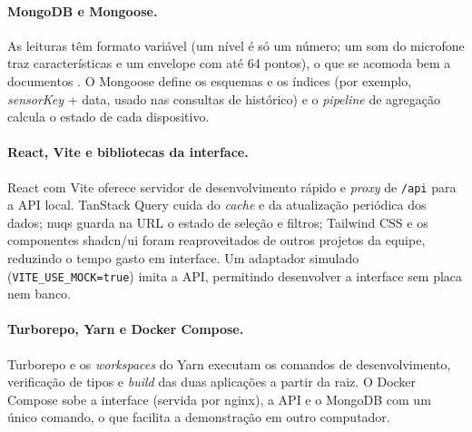 \paragraph{MongoDB e Mongoose.}
As leituras têm formato variável (um nível é só um número; um som do microfone traz características e um envelope com até 64 pontos), o que se acomoda bem a documentos \citep{mongodb}. O Mongoose \citep{mongoose} define os esquemas e os índices (por exemplo, \textit{sensorKey} + data, usado nas consultas de histórico) e o \textit{pipeline} de agregação calcula o estado de cada dispositivo.

\paragraph{React, Vite e bibliotecas da interface.}
React \citep{react} com Vite \citep{vite} oferece servidor de desenvolvimento rápido e \textit{proxy} de \texttt{/api} para a API local. TanStack Query \citep{tanstackquery} cuida do \textit{cache} e da atualização periódica dos dados; nuqs \citep{nuqs} guarda na URL o estado de seleção e filtros; Tailwind CSS \citep{tailwind} e os componentes shadcn/ui \citep{shadcn} foram reaproveitados de outros projetos da equipe, reduzindo o tempo gasto em interface. Um adaptador simulado (\texttt{VITE\_USE\_MOCK=true}) imita a API, permitindo desenvolver a interface sem placa nem banco.

\paragraph{Turborepo, Yarn e Docker Compose.}
Turborepo \citep{turborepo} e os \textit{workspaces} do Yarn \citep{yarn} executam os comandos de desenvolvimento, verificação de tipos e \textit{build} das duas aplicações a partir da raiz. O Docker Compose \citep{dockercompose} sobe a interface (servida por nginx), a API e o MongoDB com um único comando, o que facilita a demonstração em outro computador.

